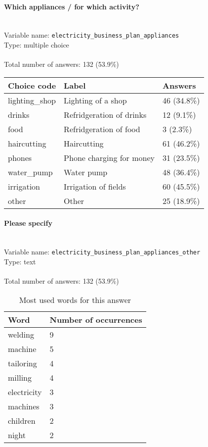 \documentclass[11.5pt, a4paper]{scrartcl}
\begin{document}
\paragraph{Which appliances / for which activity?}
\  \\Variable name: \texttt{electricity\_business\_plan\_appliances}\\
Type: multiple choice\\
\\Total number of answers: 132 (53.9\%)
\\[0.2em] \begin{tabular}{p{4cm}|p{8cm}|p{3cm}}
Choice code & Label & Answers \\
\hline
lighting\_shop & Lighting of a shop & \cellcolor{color1}46 (34.8\%)\\
\cellcolor{mygray} drinks & \cellcolor{mygray}Refridgeration of drinks & \cellcolor{color0}12 (9.1\%)\\
food & Refridgeration of food& \cellcolor{color0}3 (2.3\%)\\
\cellcolor{mygray} haircutting & \cellcolor{mygray}Haircutting & \cellcolor{color2}61 (46.2\%)\\
phones & Phone charging for money& \cellcolor{color1}31 (23.5\%)\\
\cellcolor{mygray} water\_pump & \cellcolor{mygray}Water pump & \cellcolor{color1}48 (36.4\%)\\
irrigation & Irrigation of fields& \cellcolor{color2}60 (45.5\%)\\
\cellcolor{mygray} other & \cellcolor{mygray}Other  & \cellcolor{color0}25 (18.9\%)\\
\end{tabular}
\paragraph{Please specify}
\  \\Variable name: \texttt{electricity\_business\_plan\_appliances\_other}\\
Type: text\\
\\Total number of answers: 132 (53.9\%)
\\[0.2em]\begin{table}[H]
 \begin{tabular}{p{4cm}|p{8cm}}
Word & Number of occurrences  \\
\hline
\cellcolor{mygray}welding&\cellcolor{mygray}9\\
\hline
machine&5\\
\hline
\cellcolor{mygray}tailoring&\cellcolor{mygray}4\\
\hline
milling&4\\
\hline
\cellcolor{mygray}electricity&\cellcolor{mygray}3\\
\hline
machines&3\\
\hline
\cellcolor{mygray}children&\cellcolor{mygray}2\\
\hline
night&2\\
\hline
\end{tabular}
\caption{\label{tab:table-name} Most used words for this answer}
\end{table}
\end{document}
